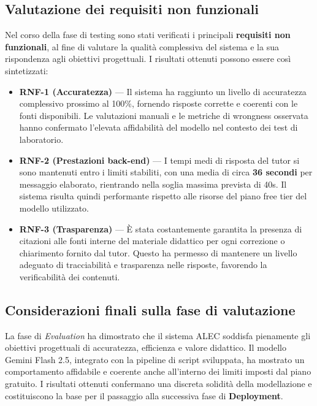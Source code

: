 \documentclass[a4paper,9pt]{article}
\begin{document}
\subsection{Valutazione dei requisiti non funzionali}

Nel corso della fase di testing sono stati verificati i principali \textbf{requisiti non funzionali}, al fine di valutare la qualità complessiva del sistema e la sua rispondenza agli obiettivi progettuali.  
I risultati ottenuti possono essere così sintetizzati:

\begin{itemize}
	\item \textbf{RNF-1 (Accuratezza)} — Il sistema ha raggiunto un livello di accuratezza complessivo prossimo al 100\%, fornendo risposte corrette e coerenti con le fonti disponibili. Le valutazioni manuali e le metriche di wrongness osservata hanno confermato l’elevata affidabilità del modello nel contesto dei test di laboratorio.
	
	\item \textbf{RNF-2 (Prestazioni back-end)} — I tempi medi di risposta del tutor si sono mantenuti entro i limiti stabiliti, con una media di circa \textbf{36 secondi} per messaggio elaborato, rientrando nella soglia massima prevista di 40s. Il sistema risulta quindi performante rispetto alle risorse del piano free tier del modello utilizzato.
	
	\item \textbf{RNF-3 (Trasparenza)} — È stata costantemente garantita la presenza di citazioni alle fonti interne del materiale didattico per ogni correzione o chiarimento fornito dal tutor. Questo ha permesso di mantenere un livello adeguato di tracciabilità e trasparenza nelle risposte, favorendo la verificabilità dei contenuti.
\end{itemize}


\subsection{Considerazioni finali sulla fase di valutazione}

La fase di \textit{Evaluation} ha dimostrato che il sistema ALEC soddisfa pienamente gli obiettivi progettuali di accuratezza, efficienza e valore didattico. 
Il modello Gemini Flash 2.5, integrato con la pipeline di script sviluppata, ha mostrato un comportamento affidabile e coerente anche all’interno dei limiti imposti dal piano gratuito. 
I risultati ottenuti confermano una discreta solidità della modellazione e costituiscono la base per il passaggio alla successiva fase di \textbf{Deployment}.
\end{document}
